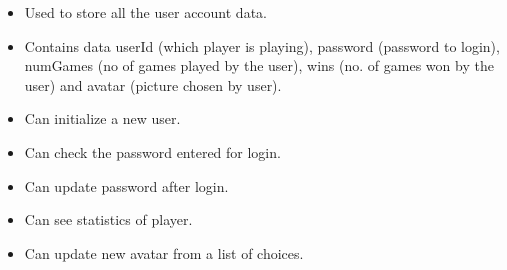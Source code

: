 \begin{enumerate}
\begin{itemize}
\item Used to store all the user account data.
\item Contains data userId (which player is playing), password (password to login), numGames (no of games played by the user), wins (no. of games won by the user) and avatar (picture chosen by user).
\item Can initialize a new user.
\item Can check the password entered for login.
\item Can update password after login.
\item Can see statistics of player.
\item Can update new avatar from a list of choices.
\end{itemize}
\end{enumerate}
